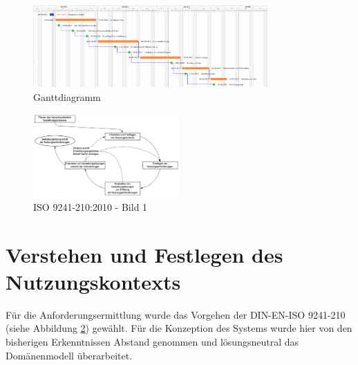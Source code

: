 \begin{figure}[h] %
\centering
    \includegraphics[width=0.8\textwidth]{images/ganttdiagramm.png}
    \caption[Ganttdiagramm]{Ganttdiagramm}
    \label{fig:ganttdiagramm}
\end{figure}
\begin{figure}[h]
\centering
    \includegraphics[width=0.5\textwidth]{images/Din-Norm-Ablaufmodell.png}
    \caption[ISO 9241-210:2010 - Bild 1]{ISO 9241-210:2010 - Bild 1}
    \label{fig:din-ablauf}
\end{figure}

\chapter{Verstehen und Festlegen des Nutzungskontexts}
Für die Anforderungsermittlung wurde das Vorgehen der DIN-EN-ISO 9241-210 \citep{DINISO_2010} (siehe Abbildung \ref{fig:din-ablauf}) gewählt. Für die Konzeption des Systems wurde hier von den bisherigen Erkenntnissen Abstand genommen und lösungsneutral das Domänenmodell überarbeitet.

